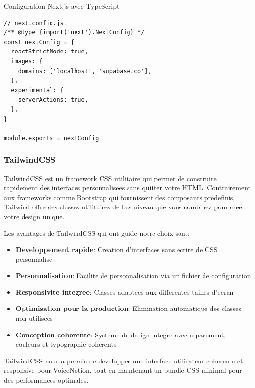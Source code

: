 \begin{codebox}{Configuration Next.js avec TypeScript}
\begin{lstlisting}
// next.config.js
/** @type {import('next').NextConfig} */
const nextConfig = {
  reactStrictMode: true,
  images: {
    domains: ['localhost', 'supabase.co'],
  },
  experimental: {
    serverActions: true,
  },
}

module.exports = nextConfig
\end{lstlisting}
\end{codebox}

\subsubsection{TailwindCSS}
\begin{minipage}{0.7\textwidth}
TailwindCSS est un framework CSS utilitaire qui permet de construire rapidement des interfaces personnalisees sans quitter votre HTML. Contrairement aux frameworks comme Bootstrap qui fournissent des composants predefinis, Tailwind offre des classes utilitaires de bas niveau que vous combinez pour creer votre design unique.

Les avantages de TailwindCSS qui ont guide notre choix sont:

\begin{itemize}
    \item \textbf{Developpement rapide}: Creation d'interfaces sans ecrire de CSS personnalise
    \item \textbf{Personnalisation}: Facilite de personnalisation via un fichier de configuration
    \item \textbf{Responsivite integree}: Classes adaptees aux differentes tailles d'ecran
    \item \textbf{Optimisation pour la production}: Elimination automatique des classes non utilisees
    \item \textbf{Conception coherente}: Systeme de design integre avec espacement, couleurs et typographie coherents
\end{itemize}

TailwindCSS nous a permis de developper une interface utilisateur coherente et responsive pour VoiceNotion, tout en maintenant un bundle CSS minimal pour des performances optimales.
\end{minipage}%
\hfill
